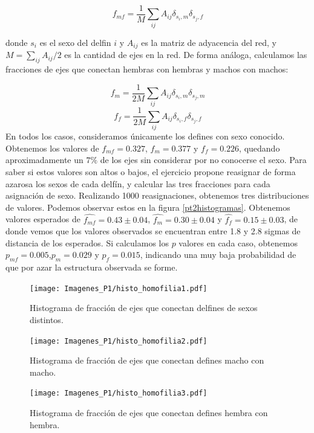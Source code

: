 \documentclass{article}
\begin{document}
\begin{equation}
    f_{mf} = \frac{1}{M}\sum_{ij} A_{ij} \delta_{s_i,m} \delta_{s_j,f}
\end{equation}

donde $s_i$ es el sexo del delfin $i$ y $A_{ij}$ es la matriz de adyacencia del red, y $M = \sum_{ij} A_{ij}/2$ es la cantidad de ejes en la red. De forma análoga, calculamos las fracciones de ejes que conectan hembras con hembras y machos con machos:

\begin{equation}
        f_{m} = \frac{1}{2M}\sum_{ij} A_{ij} \delta_{s_i,m} \delta_{s_j,m} 
\end{equation}
\begin{equation}
        f_{f} = \frac{1}{2M}\sum_{ij} A_{ij} \delta_{s_i,f} \delta_{s_j,f} 
\end{equation}
En todos los casos, consideramos únicamente los defines con sexo conocido. Obtenemos los valores de $f_{mf} = 0.327$, $f_{m} = 0.377$ y $f_{f} = 0.226$, quedando aproximadamente un $7\%$ de los ejes sin considerar por no conocerse el sexo. Para saber si estos valores son altos o bajos, el ejercicio propone reasignar de forma azarosa los sexos de cada delfín, y calcular las tres fracciones para cada asignación de sexo. Realizando 1000 reasignaciones, obtenemos tres distribuciones de valores. Podemos observar estos en la figura \ref{pt2histogramas}. Obtenemos valores esperados de $\widehat{f_{mf}} = 0.43 \pm 0.04$, $\widehat{f_{m}} = 0.30 \pm 0.04$ y $\widehat{f_{f}} = 0.15 \pm 0.03$, de donde vemos que los valores observados se encuentran entre 1.8 y 2.8 sigmas de distancia de los esperados. Si calculamos los $p$ valores en cada caso, obtenemos $p_{mf} = 0.005$,$p_m = 0.029$ y $p_f = 0.015$, indicando una muy baja probabilidad de que por azar la estructura observada se forme.

\begin{figure}[!htb]
   \begin{minipage}{0.3\textwidth}
	\centering
	\texttt{[image: Imagenes\_P1/histo\_homofilia1.pdf]}
	\caption{Histograma de fracción de ejes que conectan delfines de sexos distintos.}
	\label{pt2histo-cruces}
   \end{minipage}\hfill
   \begin{minipage}{0.3\textwidth}
	\centering
	\texttt{[image: Imagenes\_P1/histo\_homofilia2.pdf]}
	\caption{Histograma de fracción de ejes que conectan defines macho con macho.}
	\label{pt2histo-mym}
   \end{minipage}\hfill
   \begin{minipage}{0.3\textwidth}
	\centering
	\texttt{[image: Imagenes\_P1/histo\_homofilia3.pdf]}
	\caption{Histograma de fracción de ejes que conectan defines hembra con hembra.}
	\label{pt2histo-fyf}
   \end{minipage}
   \label{pt2layout}
\end{figure}
\end{document}
